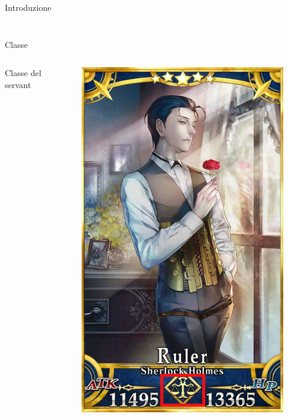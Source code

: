 \documentclass{beamer}
\begin{document}
\begin{darkframes}
\begin{frame}{Introduzione}
\begin{columns}
\begin{column}{0.5\textwidth}
\begin{figure}
        \end{figure}
      \end{column}
    \end{columns}
  \end{frame}

  \begin{frame}{Classe}
    \begin{columns}
      \begin{column}{0.5\textwidth}
        Classe del servant
      \end{column}
      \begin{column}{0.5\textwidth}
        \begin{figure}
          \centering
          \includegraphics[height=0.65\textheight]{./images/servant_class.png}
        \end{figure}
      \end{column}
    \end{columns}
  \end{frame}


\end{darkframes}
\end{document}
